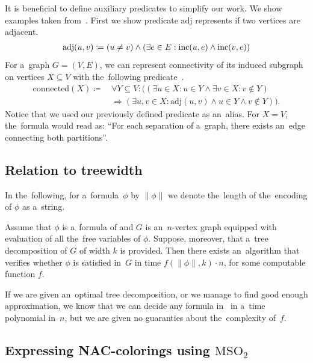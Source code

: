 It is beneficial to define auxiliary predicates to simplify our work.
We show examples taken from~\cite{book_parametrized_algorithms}.
First we show predicate \( \text{adj} \) represents if two vertices are adjacent.
%
\begin{align*}
	\text{adj}(u, v) \coloneqq (u \ne v) \land (\exists e \in E : \text{inc} (u, e) \land \text{inc} (v, e))
\end{align*}
%
For a~graph \( G = (V, E) \), we can represent connectivity of its induced subgraph
on vertices \( X \subseteq V \) with the~following predicate~\cite{book_parametrized_algorithms}.
%
\begin{align*}
	\text{connected}(X) \coloneqq \, &
	\forall Y \subseteq V : \Big(
	(
	\exists u \in X : u \in Y \land
	\exists v \in X : v \not\in Y
	)
	\\ &
	\Rightarrow
	(
	\exists u, v \in X : \text{adj}(u, v) \land u \in Y \land v \not\in Y
	)\Big).
\end{align*}
%
Notice that we used our previously defined predicate as an~alias.
For \( X = V \), the~formula would read as:
``For each separation of a~graph, there exists an~edge connecting both partitions''.

\subsection{Relation to treewidth}

In the~following, for a~formula~\( \phi \) by \( \|\phi\| \)
we denote the~length of the~encoding of \( \phi \) as a~string.
%
\begin{theorem}%
	\label{theorem:courcelles_theorem}%
	Assume that \( \phi \) is a~formula of \MSO{} and
	\( G \) is an~\( n \)-vertex graph equipped
	with evaluation of all the~free variables of \( \phi \).
	Suppose, moreover, that a~tree decomposition of \( G \) of width \( k \) is provided.
	Then there exists an~algorithm that verifies whether \( \phi \)
	is satisfied in~\( G \) in time \( f (\|\phi\|, k) \cdot n \),
	for some computable function \( f \).
\end{theorem}
%
If we are given an~optimal tree decomposition, or we manage to find good enough
approximation, we know that we can decide any formula in~\MSO{} in a~time
polynomial in~\( n \), but we are given no guaranties about the~complexity of~\( f \).

\subsection{Expressing NAC-colorings using \( \text{MSO}_2 \)}

